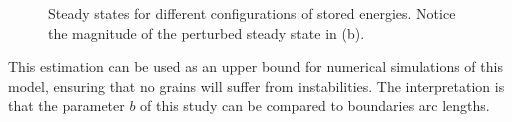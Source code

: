 \begin{figure}
    \hspace{-1em}
    \caption[Steady states for different configurations of stored energies.]{Steady states for different configurations of stored energies. Notice the magnitude of the perturbed steady state in (b).}
\end{figure}

This estimation can be used as an upper bound for numerical simulations of this model, ensuring that no grains will suffer from instabilities. 
The interpretation is that the parameter $b$ of this study can be %
compared to boundaries arc lengths. 

